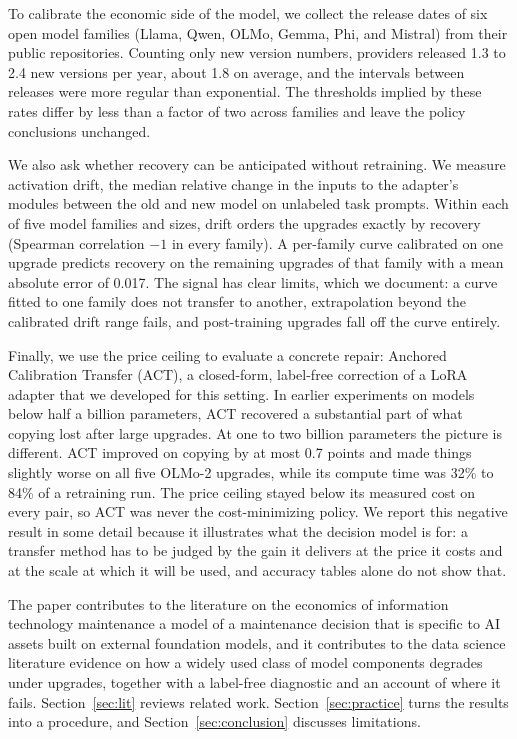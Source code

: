 \documentclass[ijds,nonblindrev]{informs4}
\begin{document}
To calibrate the economic side of the model, we collect the release dates of six open model families (Llama, Qwen, OLMo, Gemma, Phi, and Mistral) from their public repositories. Counting only new version numbers, providers released 1.3 to 2.4 new versions per year, about 1.8 on average, and the intervals between releases were more regular than exponential. The thresholds implied by these rates differ by less than a factor of two across families and leave the policy conclusions unchanged.

We also ask whether recovery can be anticipated without retraining. We measure activation drift, the median relative change in the inputs to the adapter's modules between the old and new model on unlabeled task prompts. Within each of five model families and sizes, drift orders the upgrades exactly by recovery (Spearman correlation $-1$ in every family). A per-family curve calibrated on one upgrade predicts recovery on the remaining upgrades of that family with a mean absolute error of 0.017. The signal has clear limits, which we document: a curve fitted to one family does not transfer to another, extrapolation beyond the calibrated drift range fails, and post-training upgrades fall off the curve entirely.

Finally, we use the price ceiling to evaluate a concrete repair: Anchored Calibration Transfer (ACT), a closed-form, label-free correction of a LoRA adapter that we developed for this setting. In earlier experiments on models below half a billion parameters, ACT recovered a substantial part of what copying lost after large upgrades. At one to two billion parameters the picture is different. ACT improved on copying by at most 0.7 points and made things slightly worse on all five OLMo-2 upgrades, while its compute time was 32\% to 84\% of a retraining run. The price ceiling stayed below its measured cost on every pair, so ACT was never the cost-minimizing policy. We report this negative result in some detail because it illustrates what the decision model is for: a transfer method has to be judged by the gain it delivers at the price it costs and at the scale at which it will be used, and accuracy tables alone do not show that.

The paper contributes to the literature on the economics of information technology maintenance a model of a maintenance decision that is specific to AI assets built on external foundation models, and it contributes to the data science literature evidence on how a widely used class of model components degrades under upgrades, together with a label-free diagnostic and an account of where it fails. Section~\ref{sec:lit} reviews related work. Section~\ref{sec:practice} turns the results into a procedure, and Section~\ref{sec:conclusion} discusses limitations.
\end{document}
